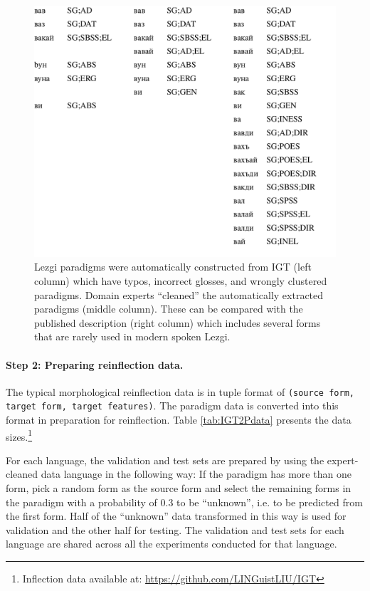 \begin{figure}[!tb]
    \centering
    \includegraphics[width=15cm]{figs/LezgiParadigms.pdf}
    \caption[Noisy to Clean Paradigms]{Lezgi paradigms were automatically constructed from IGT (left column) which have typos, incorrect glosses, and wrongly clustered paradigms. Domain experts ``cleaned'' the automatically extracted paradigms (middle column). These can be compared with the published description (right column) which includes several forms that are rarely used in modern spoken Lezgi.}
    \label{fig:cleaning}
\end{figure}

\paragraph{Step 2: Preparing reinflection data.}
The typical morphological reinflection data is in tuple format of \texttt{(source form, target form, target features)}. The paradigm data is converted into this format in preparation for reinflection. Table \ref{tab:IGT2Pdata} presents the data sizes.\footnote{Inflection data available at: \url{https://github.com/LINGuistLIU/IGT}} 

For each language, the validation and test sets are prepared by using the expert-cleaned data language in the following way: If the paradigm has more than one form, pick a random form as the source form and select the remaining forms in the paradigm with a probability of 0.3 to be ``unknown'', i.e. to be predicted from the first form. Half of the ``unknown'' data transformed in this way is used for validation and the other half for testing. The validation and test sets for each language are shared across all the experiments conducted for that language.

